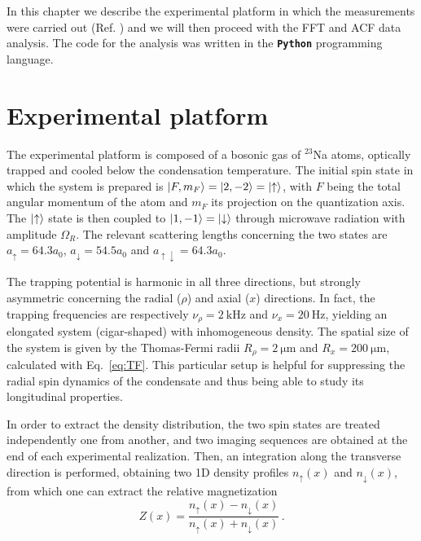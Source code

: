In this chapter we describe the experimental platform in which the measurements were carried out (Ref. \cite{zenesini2024false}) and we will then proceed with the FFT and ACF data analysis. The code for the analysis was written in the \textbf{\texttt{Python}} programming language.

\section{Experimental platform}
The experimental platform is composed of a bosonic gas of $^{23}$Na atoms, optically trapped and cooled below the condensation temperature. The initial spin state in which the system is prepared is $\ket{F, m_F} = \ket{2, -2} = \ket{\uparrow}$, with $F$ being the total angular momentum of the atom 
and $m_F$ its projection on the quantization axis. The $\ket{\uparrow}$ state is then coupled to $\ket{1, -1} = \ket{\downarrow}$ through microwave radiation with amplitude $\Omega_R$. The relevant scattering lengths concerning the two states are $a_\uparrow = 64.3 a_0$, $a_\downarrow = 54.5 a_0$ and $a_{\uparrow\downarrow} = 64.3 a_0$.

The trapping potential is harmonic in all three directions, but strongly asymmetric concerning the radial ($\rho$) and axial ($x$) directions. In fact, the trapping frequencies are respectively $\nu_\rho = 2\ \unit{\kilo\hertz}$ and $\nu_x = 20\ \unit{\hertz}$, yielding an elongated system (cigar-shaped) with inhomogeneous density. The spatial size of the system is given by the Thomas-Fermi radii $R_\rho = 2\ \unit{\micro\meter}$ and $R_x = 200\ \unit{\micro\meter}$, calculated with Eq.\ \eqref{eq:TF}. This particular setup is helpful for suppressing the radial spin dynamics of the condensate and thus being able to study its longitudinal properties.

In order to extract the density distribution, the two spin states are treated independently one from another, and two imaging sequences are obtained at the end of each experimental realization. Then, an integration along the transverse direction is performed, obtaining two 1D density profiles $n_\uparrow(x)$ and $n_\downarrow(x)$, from which one can extract the relative magnetization
\begin{equation}
    Z(x) = \frac{n_\uparrow(x) - n_\downarrow(x)}{n_\uparrow(x) + n_\downarrow(x)}\, .
    \label{eq:magnetization}
\end{equation}

